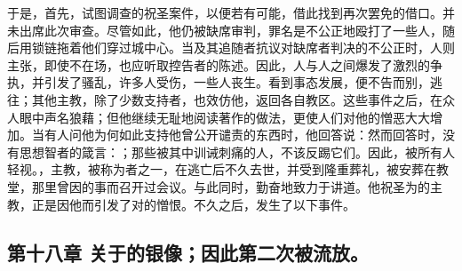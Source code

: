 于是，首先，试图调查的祝圣案件，以便若有可能，借此找到再次罢免的借口。并未出席此次审查。尽管如此，他仍被缺席审判，罪名是不公正地殴打了一些人，随后用锁链拖着他们穿过城中心。当及其追随者抗议对缺席者判决的不公正时，人则主张，即使不在场，也应听取控告者的陈述。因此，人与人之间爆发了激烈的争执，并引发了骚乱，许多人受伤，一些人丧生。看到事态发展，便不告而别，逃往；其他主教，除了少数支持者，也效仿他，返回各自教区。这些事件之后，在众人眼中声名狼藉；但他继续无耻地阅读著作的做法，更使人们对他的憎恶大大增加。当有人问他为何如此支持他曾公开谴责的东西时，他回答说：然而回答时，没有思想智者的箴言：；那些被其中训诫刺痛的人，不该反踢它们。因此，被所有人轻视。，主教，被称为者之一，在逃亡后不久去世，并受到隆重葬礼，被安葬在教堂，那里曾因的事而召开过会议。与此同时，勤奋地致力于讲道。他祝圣为的主教，正是因他而引发了对的憎恨。不久之后，发生了以下事件。\par


\subsection{第十八章 关于的银像；因此第二次被流放。}

